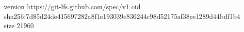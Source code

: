 version https://git-lfs.github.com/spec/v1
oid sha256:7d85d24de415697282a8f1e193039e830244c98d52175af38ee1289d44bdf1b4
size 21960

